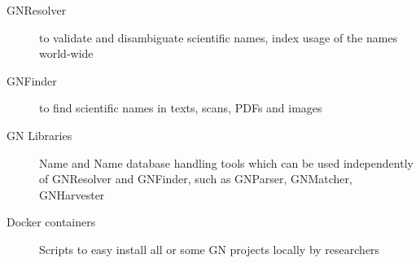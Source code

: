 \documentclass[11pt]{article}
\begin{document}
\begin{description}

  \item[GNResolver] to validate and disambiguate scientific names, index usage
    of the names world-wide

  \item[GNFinder] to find scientific names in texts, scans, PDFs and images

  \item[GN Libraries] Name and Name database handling tools which can be used
    independently of GNResolver and GNFinder, such as GNParser, GNMatcher,
    GNHarvester

  \item[Docker containers] Scripts to easy install all or some GN projects
    locally by researchers

\end{description}

\end{document}
